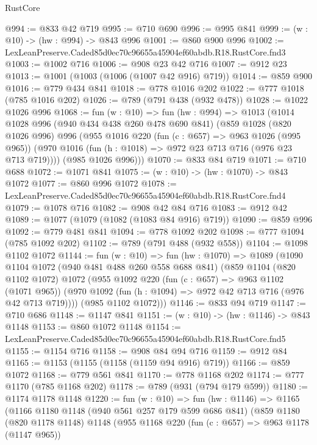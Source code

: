\begin{lexlean}{RustCore}
\begin{coremodule}
@994 := @833 @42 @719
@995 := @710 @690
@996 := @995 @841
@999 := (w : @10) -> (hw : @994) -> @843 @996
@1001 := @860 @900 @996
@1002 := LexLeanPreserve.Caded85d0ec70c96655a45904ef60abdb.R18.RustCore.fnd3
@1003 := @1002 @716
@1006 := @908 @23 @42 @716
@1007 := @912 @23
@1013 := @1001 (@1003 (@1006 (@1007 @42 @916) @719))
@1014 := @859 @900
@1016 := @779 @434 @841
@1018 := @778 @1016 @202
@1022 := @777 @1018 (@785 @1016 @202)
@1026 := @789 (@791 @438 (@932 @478))
@1028 := @1022 @1026 @996
@1068 := fun (w : @10) =>
  fun (hw : @994) =>
  @1013
    (@1014
      @1028
      @996
      (@940 @434 @438 @260 @478 @690 @841)
      (@859
        @1028
        (@820 @1026 @996)
        @996
        (@955
          @1016
          @220
          (fun (c : @657) => @963 @1026 (@995 @965))
          (@970 @1016 (fun (h : @1018) => @972 @23 @713 @716 (@976 @23 @713 @719))))
        (@985 @1026 @996)))
@1070 := @833 @84 @719
@1071 := @710 @688
@1072 := @1071 @841
@1075 := (w : @10) -> (hw : @1070) -> @843 @1072
@1077 := @860 @996 @1072
@1078 := LexLeanPreserve.Caded85d0ec70c96655a45904ef60abdb.R18.RustCore.fnd4
@1079 := @1078 @716
@1082 := @908 @42 @84 @716
@1083 := @912 @42
@1089 := @1077 (@1079 (@1082 (@1083 @84 @916) @719))
@1090 := @859 @996
@1092 := @779 @481 @841
@1094 := @778 @1092 @202
@1098 := @777 @1094 (@785 @1092 @202)
@1102 := @789 (@791 @488 (@932 @558))
@1104 := @1098 @1102 @1072
@1144 := fun (w : @10) =>
  fun (hw : @1070) =>
  @1089
    (@1090
      @1104
      @1072
      (@940 @481 @488 @260 @558 @688 @841)
      (@859
        @1104
        (@820 @1102 @1072)
        @1072
        (@955
          @1092
          @220
          (fun (c : @657) => @963 @1102 (@1071 @965))
          (@970 @1092 (fun (h : @1094) => @972 @42 @713 @716 (@976 @42 @713 @719))))
        (@985 @1102 @1072)))
@1146 := @833 @94 @719
@1147 := @710 @686
@1148 := @1147 @841
@1151 := (w : @10) -> (hw : @1146) -> @843 @1148
@1153 := @860 @1072 @1148
@1154 := LexLeanPreserve.Caded85d0ec70c96655a45904ef60abdb.R18.RustCore.fnd5
@1155 := @1154 @716
@1158 := @908 @84 @94 @716
@1159 := @912 @84
@1165 := @1153 (@1155 (@1158 (@1159 @94 @916) @719))
@1166 := @859 @1072
@1168 := @779 @561 @841
@1170 := @778 @1168 @202
@1174 := @777 @1170 (@785 @1168 @202)
@1178 := @789 (@931 (@794 @179 @599))
@1180 := @1174 @1178 @1148
@1220 := fun (w : @10) =>
  fun (hw : @1146) =>
  @1165
    (@1166
      @1180
      @1148
      (@940 @561 @257 @179 @599 @686 @841)
      (@859
        @1180
        (@820 @1178 @1148)
        @1148
        (@955
          @1168
          @220
          (fun (c : @657) => @963 @1178 (@1147 @965))

\end{coremodule}
\end{lexlean}
